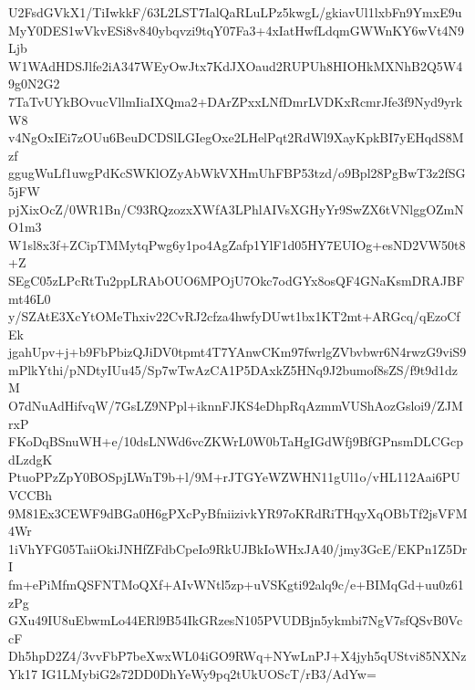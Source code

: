U2FsdGVkX1/TiIwkkF/63L2LST7IalQaRLuLPz5kwgL/gkiavUl1lxbFn9YmxE9u
MyY0DES1wVkvESi8v840ybqvzi9tqY07Fa3+4xIatHwfLdqmGWWnKY6wVt4N9Ljb
W1WAdHDSJlfe2iA347WEyOwJtx7KdJXOaud2RUPUh8HIOHkMXNhB2Q5W49g0N2G2
7TaTvUYkBOvucVllmIiaIXQma2+DArZPxxLNfDmrLVDKxRcmrJfe3f9Nyd9yrkW8
v4NgOxIEi7zOUu6BeuDCDSlLGIegOxe2LHelPqt2RdWl9XayKpkBI7yEHqdS8Mzf
ggugWuLf1uwgPdKcSWKlOZyAbWkVXHmUhFBP53tzd/o9Bpl28PgBwT3z2fSG5jFW
pjXixOcZ/0WR1Bn/C93RQzozxXWfA3LPhlAIVsXGHyYr9SwZX6tVNlggOZmNO1m3
W1sl8x3f+ZCipTMMytqPwg6y1po4AgZafp1YlF1d05HY7EUIOg+esND2VW50t8+Z
SEgC05zLPcRtTu2ppLRAbOUO6MPOjU7Okc7odGYx8osQF4GNaKsmDRAJBFmt46L0
y/SZAtE3XcYtOMeThxiv22CvRJ2cfza4hwfyDUwt1bx1KT2mt+ARGcq/qEzoCfEk
jgahUpv+j+b9FbPbizQJiDV0tpmt4T7YAnwCKm97fwrlgZVbvbwr6N4rwzG9viS9
mPlkYthi/pNDtyIUu45/Sp7wTwAzCA1P5DAxkZ5HNq9J2bumof8sZS/f9t9d1dzM
O7dNuAdHifvqW/7GsLZ9NPpl+iknnFJKS4eDhpRqAzmmVUShAozGsloi9/ZJMrxP
FKoDqBSnuWH+e/10dsLNWd6vcZKWrL0W0bTaHgIGdWfj9BfGPnsmDLCGcpdLzdgK
PtuoPPzZpY0BOSpjLWnT9b+l/9M+rJTGYeWZWHN11gUl1o/vHL112Aai6PUVCCBh
9M81Ex3CEWF9dBGa0H6gPXcPyBfniizivkYR97oKRdRiTHqyXqOBbTf2jsVFM4Wr
1iVhYFG05TaiiOkiJNHfZFdbCpeIo9RkUJBkIoWHxJA40/jmy3GcE/EKPn1Z5DrI
fm+ePiMfmQSFNTMoQXf+AIvWNtl5zp+uVSKgti92alq9c/e+BIMqGd+uu0z61zPg
GXu49IU8uEbwmLo44ERl9B54IkGRzesN105PVUDBjn5ykmbi7NgV7sfQSvB0VccF
Dh5hpD2Z4/3vvFbP7beXwxWL04iGO9RWq+NYwLnPJ+X4jyh5qUStvi85NXNzYk17
IG1LMybiG2s72DD0DhYeWy9pq2tUkUOScT/rB3/AdYw=
